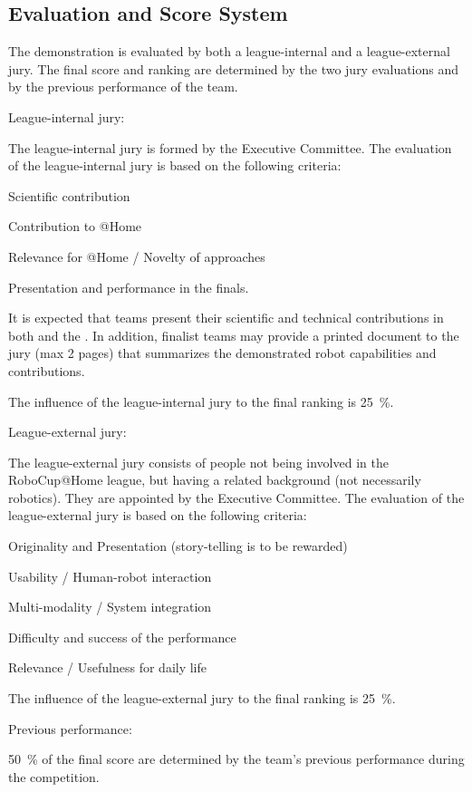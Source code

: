 \subsection{Evaluation and Score System}
The demonstration is evaluated by both a league-internal and a league-external jury.
The final score and ranking are determined by the two jury evaluations and by the previous performance of the team.
\begin{enumerate}
{\bf\item League-internal jury:} The league-internal jury is formed by the Executive Committee.
The evaluation of the league-internal jury is based on the following criteria:
  \begin{compactenum}
  \item Scientific contribution %
  \item Contribution to @Home %
  \item Relevance for @Home / Novelty of approaches %
  \item Presentation and performance in the finals.
  \end{compactenum}
It is expected that teams present their scientific and technical contributions in both  and the .
In addition, finalist teams may provide a printed document to the jury (max 2 pages) that summarizes the demonstrated robot capabilities and contributions.  

  The influence of the league-internal jury to the final ranking is \SI{25}{\percent}.

{\bf\item League-external jury:} The league-external jury consists of people not being involved in the RoboCup@Home league,
but having a related background (not necessarily robotics).
They are appointed by the Executive Committee.
The evaluation of the league-external jury is based on the following criteria:
  \begin{compactenum}
  \item Originality and Presentation
    (story-telling is to be rewarded)
  \item Usability / Human-robot interaction
  \item Multi-modality / System integration
  \item Difficulty and success of the performance
  \item Relevance / Usefulness for daily life
  \end{compactenum}
  The influence of the league-external jury to the final ranking is \SI{25}{\percent}.

{\bf\item Previous performance:} \SI{50}{\percent} of the final score are determined by the team's previous performance during the competition.
\end{enumerate}

